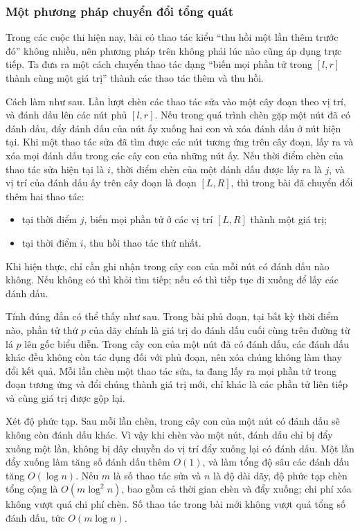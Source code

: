 \documentclass[11pt]{article}
\begin{document}
\subsubsection{Một phương pháp chuyển đổi tổng quát}

Trong các cuộc thi hiện nay, bài có thao tác kiểu ``thu hồi một lần thêm trước
đó'' không nhiều, nên phương pháp trên không phải lúc nào cũng áp dụng trực
tiếp. Ta đưa ra một cách chuyển thao tác dạng ``biến mọi phần tử trong
\([l,r]\) thành cùng một giá trị'' thành các thao tác thêm và thu hồi.

Cách làm như sau. Lần lượt chèn các thao tác sửa vào một cây đoạn theo vị trí,
và đánh dấu lên các nút phủ \([l,r]\). Nếu trong quá trình chèn gặp một nút đã
có đánh dấu, đẩy đánh dấu của nút ấy xuống hai con và xóa đánh dấu ở nút hiện
tại. Khi một thao tác sửa đã tìm được các nút tương ứng trên cây đoạn, lấy ra
và xóa mọi đánh dấu trong các cây con của những nút ấy. Nếu thời điểm chèn của
thao tác sửa hiện tại là \(i\), thời điểm chèn của một đánh dấu được lấy ra là
\(j\), và vị trí của đánh dấu ấy trên cây đoạn là đoạn \([L,R]\), thì trong
bài đã chuyển đổi thêm hai thao tác:
\begin{itemize}
  \item tại thời điểm \(j\), biến mọi phần tử ở các vị trí \([L,R]\) thành một
  giá trị;
  \item tại thời điểm \(i\), thu hồi thao tác thứ nhất.
\end{itemize}

Khi hiện thực, chỉ cần ghi nhận trong cây con của mỗi nút có đánh dấu nào
không. Nếu không có thì khỏi tìm tiếp; nếu có thì tiếp tục đi xuống để lấy các
đánh dấu.

Tính đúng đắn có thể thấy như sau. Trong bài phủ đoạn, tại bất kỳ thời điểm
nào, phần tử thứ \(p\) của dãy chính là giá trị do đánh dấu cuối cùng trên
đường từ lá \(p\) lên gốc biểu diễn. Trong cây con của một nút đã có đánh dấu,
các đánh dấu khác đều không còn tác dụng đối với phủ đoạn, nên xóa chúng không
làm thay đổi kết quả. Mỗi lần chèn một thao tác sửa, ta đang lấy ra mọi phần
tử trong đoạn tương ứng và đổi chúng thành giá trị mới, chỉ khác là các phần
tử liên tiếp và cùng giá trị được gộp lại.

Xét độ phức tạp. Sau mỗi lần chèn, trong cây con của một nút có đánh dấu sẽ
không còn đánh dấu khác. Vì vậy khi chèn vào một nút, đánh dấu chỉ bị đẩy
xuống một lần, không bị dây chuyền do vị trí đẩy xuống lại có đánh dấu. Một
lần đẩy xuống làm tăng số đánh dấu thêm \(O(1)\), và làm tổng độ sâu các đánh
dấu tăng \(O(\log n)\). Nếu \(m\) là số thao tác sửa và \(n\) là độ dài dãy,
độ phức tạp chèn tổng cộng là \(O(m\log^2 n)\), bao gồm cả thời gian chèn và
đẩy xuống; chi phí xóa không vượt quá chi phí chèn. Số thao tác trong bài mới
không vượt quá tổng số đánh dấu, tức \(O(m\log n)\).
\end{document}
